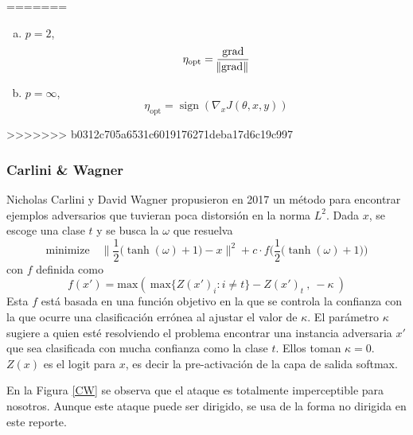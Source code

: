     
=======
\begin{enumerate}[a)]
    \item $p = 2$,
    \[\eta_{\text{opt}} = \frac{\operatorname{grad}}{\norm{\operatorname{grad}}}\]
    \item $p = \infty$,
    \[\eta_{\text{opt}} = \operatorname{sign}(\nabla_x J(\theta, x, y))\]
\end{enumerate}
>>>>>>> b0312c705a6531c6019176271deba17d6c19c997


\subsubsection{Carlini \& Wagner}
Nicholas Carlini y David Wagner \cite{carlini2017evaluating} propusieron en 2017 un método para encontrar ejemplos adversarios que tuvieran poca distorsión en la norma $L^2$. Dada $x$, se escoge una clase $t$ y se busca la $\omega$ que resuelva
\begin{equation*}
    \text{minimize} \quad \Big\lVert \dfrac{1}{2}\big(\tanh(\omega) + 1\big) - x \Big\rVert^2 + c\cdot f\bigg(\dfrac{1}{2}\big(\tanh(\omega) + 1\big)\bigg)
\end{equation*}
con $f$ definida como
\begin{equation*}
    f(x') = \text{max}(\ \text{max}\{Z(x')_i : i\neq t\} - Z(x')_t\ ,\ -\kappa\ )
\end{equation*}
Esta $f$ está basada en una función objetivo en la que se controla la confianza con la que ocurre una clasificación errónea al ajustar el valor de $\kappa$. El parámetro $\kappa$ sugiere a quien esté resolviendo el problema encontrar una instancia adversaria $x'$ que sea clasificada con mucha confianza como la clase $t$. Ellos toman $\kappa = 0$. $Z(x)$ es el logit para $x$, es decir la pre-activación de la capa de salida softmax.

En la Figura \ref{CW} se observa que el ataque es totalmente imperceptible para nosotros. Aunque este ataque puede ser dirigido, se usa de la forma no dirigida en este reporte. 

